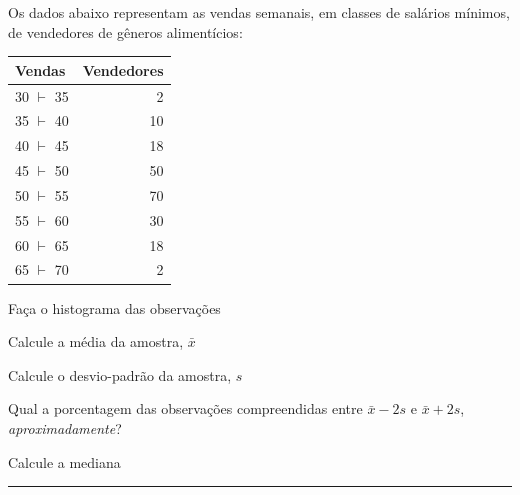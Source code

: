 \documentclass[a4paper,11pt,fleqn]{article}\usepackage[]{graphicx}\usepackage[]{color}
\theoremstyle{definition}
\begin{document}
\begin{compactenum}[7.] %
\item Os dados abaixo representam as vendas semanais, em classes de
  salários mínimos, de vendedores de gêneros alimentícios:
\begin{table}[ht]
\centering
\begin{tabular}{lr}
  \hline
Vendas & Vendedores \\ 
  \hline
30 $\vdash$ 35 & 2 \\ 
  35 $\vdash$ 40 & 10 \\ 
  40 $\vdash$ 45 & 18 \\ 
  45 $\vdash$ 50 & 50 \\ 
  50 $\vdash$ 55 & 70 \\ 
  55 $\vdash$ 60 & 30 \\ 
  60 $\vdash$ 65 & 18 \\ 
  65 $\vdash$ 70 & 2 \\ 
   \hline
\end{tabular}
\end{table}

\begin{compactenum}
\item Faça o histograma das observações

\item Calcule a média da amostra, $\bar{x}$

\item Calcule o desvio-padrão da amostra, $s$

\item Qual a porcentagem das observações compreendidas entre $\bar{x} -
  2s$ e $\bar{x} + 2s$, \textit{aproximadamente}?

\item Calcule a mediana

\end{compactenum}
\end{compactenum}

\vspace{0.3cm}
\hrule
\vspace{0.3cm}
\end{document}
